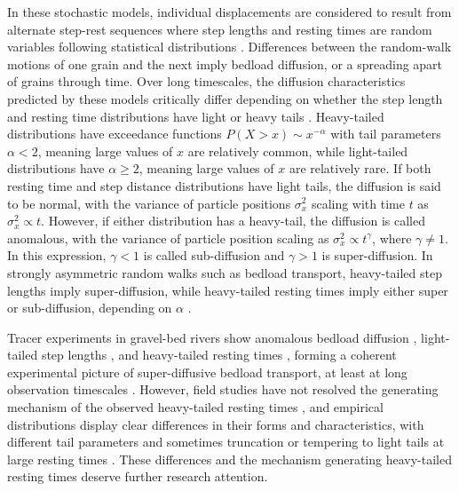 \documentclass[draft]{agujournal2018}
\begin{document}
In these stochastic models, individual displacements are considered to result from alternate step-rest sequences where step lengths and resting times are random variables following statistical distributions \citep{Einstein1937, Yano1969, Nakagawa1976, Hassan1991, Bradley2012}.
Differences between the random-walk motions of one grain and the next imply bedload diffusion, or a spreading apart of grains through time.
Over long timescales, the diffusion characteristics predicted by these models critically differ depending on whether the step length and resting time distributions have light or heavy tails \citep[e.g.,][]{Weeks1998}.
Heavy-tailed distributions have exceedance functions $P(X>x) \sim x^{-\alpha}$ with tail parameters $\alpha < 2$, meaning large values of $x$ are relatively common, while light-tailed distributions have $\alpha \geq 2$, meaning large values of $x$ are relatively rare.
If both resting time and step distance distributions have light tails, the diffusion is said to be normal, with the variance of particle positions $\sigma_x^2$
scaling with time $t$ as $\sigma_x^2 \propto t$.
However, if either distribution has a heavy-tail, the diffusion is called anomalous, with the variance of particle position scaling as $\sigma_x^2 \propto t^\gamma$, where $\gamma\neq 1$.
In this expression, $\gamma <1$ is called sub-diffusion and $\gamma > 1$ is super-diffusion.
In strongly asymmetric random walks such as bedload transport, heavy-tailed step lengths imply super-diffusion, while heavy-tailed resting times imply either super or sub-diffusion, depending on $\alpha$ \citep{Weeks1996, Weeks1998,Bradley2017}.

Tracer experiments in gravel-bed rivers show anomalous bedload diffusion \citep{Phillips2013, Bradley2017}, light-tailed step lengths \citep{Bradley2012, Hassan2013,Phillips2013}, and heavy-tailed resting times \citep{Voepel2013, Olinde2015, Pretzlav2016, Bradley2017}, forming a coherent experimental picture of super-diffusive bedload transport, at least at long observation timescales \citep[e.g.,][]{Nikora2002, Martin2012}.
However, field studies have not resolved the generating mechanism of the observed heavy-tailed resting times \citep[e.g.,][]{Bradley2017}, and empirical distributions display clear differences in their forms and characteristics, with different tail parameters \citep[e.g.,][]{Olinde2015,Pretzlav2016} and sometimes truncation \citep[e.g.,][]{Bradley2017} or tempering to light tails at large resting times \citep[e.g.,][]{Voepel2013}.
These differences and the mechanism generating heavy-tailed resting times deserve further research attention.
\end{document}
